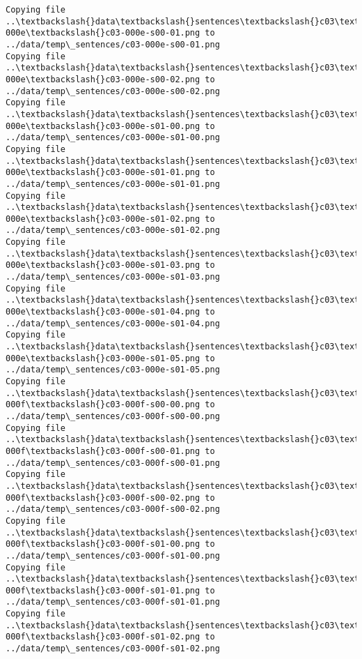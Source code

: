 \documentclass[11pt]{article}
\begin{document}
\begin{Verbatim}[commandchars=\\\{\}]
Copying file ..\textbackslash{}data\textbackslash{}sentences\textbackslash{}c03\textbackslash{}c03-000e\textbackslash{}c03-000e-s00-01.png to
../data/temp\_sentences/c03-000e-s00-01.png
Copying file ..\textbackslash{}data\textbackslash{}sentences\textbackslash{}c03\textbackslash{}c03-000e\textbackslash{}c03-000e-s00-02.png to
../data/temp\_sentences/c03-000e-s00-02.png
Copying file ..\textbackslash{}data\textbackslash{}sentences\textbackslash{}c03\textbackslash{}c03-000e\textbackslash{}c03-000e-s01-00.png to
../data/temp\_sentences/c03-000e-s01-00.png
Copying file ..\textbackslash{}data\textbackslash{}sentences\textbackslash{}c03\textbackslash{}c03-000e\textbackslash{}c03-000e-s01-01.png to
../data/temp\_sentences/c03-000e-s01-01.png
Copying file ..\textbackslash{}data\textbackslash{}sentences\textbackslash{}c03\textbackslash{}c03-000e\textbackslash{}c03-000e-s01-02.png to
../data/temp\_sentences/c03-000e-s01-02.png
Copying file ..\textbackslash{}data\textbackslash{}sentences\textbackslash{}c03\textbackslash{}c03-000e\textbackslash{}c03-000e-s01-03.png to
../data/temp\_sentences/c03-000e-s01-03.png
Copying file ..\textbackslash{}data\textbackslash{}sentences\textbackslash{}c03\textbackslash{}c03-000e\textbackslash{}c03-000e-s01-04.png to
../data/temp\_sentences/c03-000e-s01-04.png
Copying file ..\textbackslash{}data\textbackslash{}sentences\textbackslash{}c03\textbackslash{}c03-000e\textbackslash{}c03-000e-s01-05.png to
../data/temp\_sentences/c03-000e-s01-05.png
Copying file ..\textbackslash{}data\textbackslash{}sentences\textbackslash{}c03\textbackslash{}c03-000f\textbackslash{}c03-000f-s00-00.png to
../data/temp\_sentences/c03-000f-s00-00.png
Copying file ..\textbackslash{}data\textbackslash{}sentences\textbackslash{}c03\textbackslash{}c03-000f\textbackslash{}c03-000f-s00-01.png to
../data/temp\_sentences/c03-000f-s00-01.png
Copying file ..\textbackslash{}data\textbackslash{}sentences\textbackslash{}c03\textbackslash{}c03-000f\textbackslash{}c03-000f-s00-02.png to
../data/temp\_sentences/c03-000f-s00-02.png
Copying file ..\textbackslash{}data\textbackslash{}sentences\textbackslash{}c03\textbackslash{}c03-000f\textbackslash{}c03-000f-s01-00.png to
../data/temp\_sentences/c03-000f-s01-00.png
Copying file ..\textbackslash{}data\textbackslash{}sentences\textbackslash{}c03\textbackslash{}c03-000f\textbackslash{}c03-000f-s01-01.png to
../data/temp\_sentences/c03-000f-s01-01.png
Copying file ..\textbackslash{}data\textbackslash{}sentences\textbackslash{}c03\textbackslash{}c03-000f\textbackslash{}c03-000f-s01-02.png to
../data/temp\_sentences/c03-000f-s01-02.png

\end{Verbatim}
\end{document}
